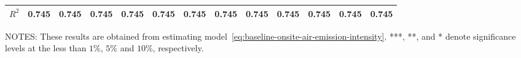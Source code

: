 \begin{table}[H]
{\begin{tabular}{@{}lllllllllllll@{}}
            $R^2$                               & 0.745     & 0.745     & 0.745     & 0.745     & 0.745     & 0.745     & 0.745                & 0.745                & 0.745                & 0.745             & 0.745             & 0.745             \\ \bottomrule\bottomrule
        \end{tabular}%
    }
    \begin{minipage}{\columnwidth}
        \vspace{0.05in}
        \tiny NOTES: These results are obtained from estimating model~\ref{eq:baseline-onsite-air-emission-intensity}. ***, **, and * denote significance levels at the less than $1\%$, $5\%$ and $10\%$, respectively.
    \end{minipage}
\end{table}